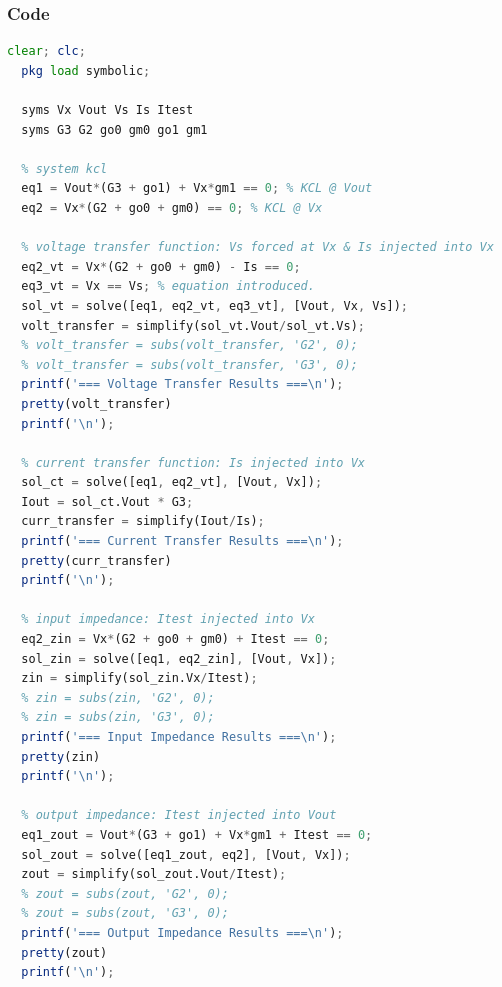 \subsubsection{Code}
\begin{lstlisting}[language=Octave]
  clear; clc;
  pkg load symbolic;

  syms Vx Vout Vs Is Itest
  syms G3 G2 go0 gm0 go1 gm1

  % system kcl
  eq1 = Vout*(G3 + go1) + Vx*gm1 == 0; % KCL @ Vout
  eq2 = Vx*(G2 + go0 + gm0) == 0; % KCL @ Vx

  % voltage transfer function: Vs forced at Vx & Is injected into Vx
  eq2_vt = Vx*(G2 + go0 + gm0) - Is == 0;
  eq3_vt = Vx == Vs; % equation introduced.
  sol_vt = solve([eq1, eq2_vt, eq3_vt], [Vout, Vx, Vs]);
  volt_transfer = simplify(sol_vt.Vout/sol_vt.Vs);
  % volt_transfer = subs(volt_transfer, 'G2', 0);
  % volt_transfer = subs(volt_transfer, 'G3', 0);
  printf('=== Voltage Transfer Results ===\n');
  pretty(volt_transfer)
  printf('\n');

  % current transfer function: Is injected into Vx
  sol_ct = solve([eq1, eq2_vt], [Vout, Vx]);
  Iout = sol_ct.Vout * G3;
  curr_transfer = simplify(Iout/Is);
  printf('=== Current Transfer Results ===\n');
  pretty(curr_transfer)
  printf('\n');

  % input impedance: Itest injected into Vx
  eq2_zin = Vx*(G2 + go0 + gm0) + Itest == 0;
  sol_zin = solve([eq1, eq2_zin], [Vout, Vx]);
  zin = simplify(sol_zin.Vx/Itest);
  % zin = subs(zin, 'G2', 0);
  % zin = subs(zin, 'G3', 0);
  printf('=== Input Impedance Results ===\n');
  pretty(zin)
  printf('\n');

  % output impedance: Itest injected into Vout
  eq1_zout = Vout*(G3 + go1) + Vx*gm1 + Itest == 0;
  sol_zout = solve([eq1_zout, eq2], [Vout, Vx]);
  zout = simplify(sol_zout.Vout/Itest);
  % zout = subs(zout, 'G2', 0);
  % zout = subs(zout, 'G3', 0);
  printf('=== Output Impedance Results ===\n');
  pretty(zout)
  printf('\n');
\end{lstlisting}

